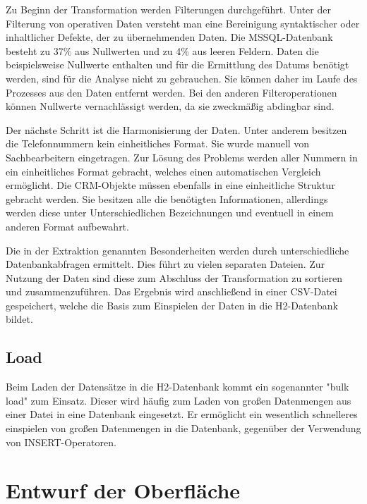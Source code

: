 Zu Beginn der Transformation werden Filterungen durchgeführt. Unter der Filterung von operativen Daten versteht man eine Bereinigung syntaktischer oder inhaltlicher Defekte, der zu übernehmenden Daten. Die MSSQL-Datenbank besteht zu 37\% aus Nullwerten und zu 4\% aus leeren Feldern. Daten die beispielsweise Nullwerte enthalten und für die Ermittlung des Datums benötigt werden, sind für die Analyse nicht zu gebrauchen. Sie können daher im Laufe des Prozesses aus den Daten entfernt werden. Bei den anderen Filteroperationen können Nullwerte vernachlässigt werden, da sie zweckmäßig abdingbar sind.

Der nächste Schritt ist die Harmonisierung der Daten. Unter anderem besitzen die Telefonnummern kein einheitliches Format. Sie wurde manuell von Sachbearbeitern eingetragen. Zur Lösung des Problems werden aller Nummern in ein einheitliches Format gebracht, welches einen automatischen Vergleich ermöglicht. Die CRM-Objekte müssen ebenfalls in eine einheitliche Struktur gebracht werden. Sie besitzen alle die benötigten Informationen, allerdings werden diese unter Unterschiedlichen Bezeichnungen und eventuell in einem anderen Format aufbewahrt.

Die in der Extraktion genannten Besonderheiten werden durch unterschiedliche Datenbankabfragen ermittelt. Dies führt zu vielen separaten Dateien. Zur Nutzung der Daten sind diese zum Abschluss der Transformation zu sortieren und zusammenzuführen. Das Ergebnis wird anschließend in einer CSV-Datei gespeichert, welche die Basis zum Einspielen der Daten in die H2-Datenbank bildet. 

\subsection{Load}

Beim Laden der Datensätze in die H2-Datenbank kommt ein sogenannter "bulk load" zum Einsatz. Dieser wird häufig zum Laden von großen Datenmengen aus einer Datei in eine Datenbank eingesetzt. Er ermöglicht ein wesentlich schnelleres einspielen von großen Datenmengen in die Datenbank, gegenüber der Verwendung von INSERT-Operatoren.

\section{Entwurf der Oberfläche}
\label{ch:Konzeption:sec:Darstellungskonzepte}


